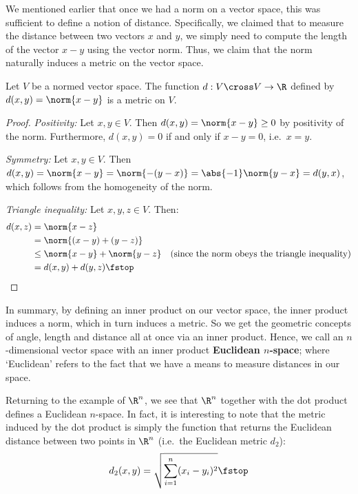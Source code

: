 We mentioned earlier that once we had a norm on a vector space, this was sufficient to define a notion of distance. Specifically, we claimed that to measure the distance between two vectors \( x \) and \( y \), we simply need to compute the length of the vector \( x-y \) using the vector norm. Thus, we claim that the norm naturally induces a metric on the vector space.

\begin{theorem}
  Let \( V \) be a normed vector space. The function \( d:V\cross V\to\R \) defined by \( d(x,y)=\norm{x-y} \) is a metric on \( V \).
\end{theorem}
\begin{proof}
  \emph{Positivity:} Let \( x,y\in V \). Then \( d(x,y)=\norm{x-y}\geq 0 \) by positivity of the norm. Furthermore, \( d(x,y)=0 \) if and only if \( x-y=0 \), i.e.\ \( x=y \).

  \vspace{3mm}

  \emph{Symmetry:} Let \( x,y\in V \). Then \( d(x,y)=\norm{x-y}=\norm{-(y-x)}=\abs{-1}\norm{y-x}=d(y,x) \), which follows from the homogeneity of the norm.

  \vspace{3mm}

  \emph{Triangle inequality:} Let \( x,y,z\in V \). Then:
  \begin{align*}
    d(x,z)&= \norm{x-z}\\
    &= \norm{(x-y)+(y-z)}\\
    &\leq \norm{x-y}+\norm{y-z} &(\text{since the norm obeys the triangle inequality})\\
    &= d(x,y)+d(y,z)\fstop
  \end{align*}
\end{proof}

In summary, by defining an inner product on our vector space, the inner product induces a norm, which in turn induces a metric. So we get the geometric concepts of angle, length and distance all at once via an inner product. Hence, we call an \( n \)-dimensional vector space with an inner product \textbf{Euclidean \( n \)-space}; where `Euclidean' refers to the fact that we have a means to measure distances in our space.

\vspace{3mm}

Returning to the example of \( \R^n \), we see that \( \R^n \) together with the dot product defines a Euclidean \( n \)-space. In fact, it is interesting to note that the metric induced by the dot product is simply the function that returns the Euclidean distance between two points in \( \R^n \) (i.e.\ the Euclidean metric \( d_2 \)):
\[ d_2(x,y)=\sqrt{\sum_{i=1}^n(x_i-y_i)^2}\fstop \]

